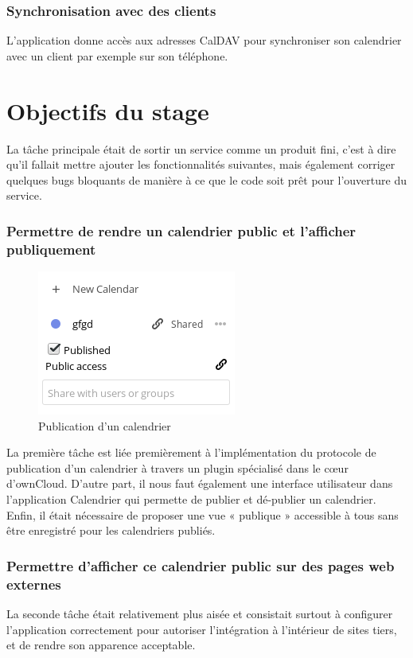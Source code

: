 \documentclass[10pt,a4paper, twoside]{report}
\begin{document}
	\subsubsection{Synchronisation avec des clients}
	L'application donne accès aux adresses CalDAV pour synchroniser son calendrier avec un client par exemple sur son téléphone.
	
	\section{Objectifs du stage}
	
	La tâche principale était de sortir un service comme un produit fini, c'est à dire qu'il fallait mettre ajouter les fonctionnalités suivantes, mais également corriger quelques bugs bloquants de manière à ce que le code soit prêt pour l'ouverture du service.
	
	\subsubsection{Permettre de rendre un calendrier public et l'afficher publiquement}
	
	\begin{figure}
		\begin{center}
		\includegraphics[width=0.3\paperwidth]{images/fonctionnalitepublie.png}
	\end{center}
		\caption{Publication d'un calendrier}
	\end{figure}
	
	La première tâche est liée premièrement à l'implémentation du protocole de publication d'un calendrier à travers un plugin spécialisé dans le cœur d'ownCloud. D'autre part, il nous faut également une interface utilisateur dans l'application Calendrier qui permette de publier et dé-publier un calendrier. Enfin, il était nécessaire de proposer une vue « publique » accessible à tous sans être enregistré pour les calendriers publiés.

	
	\subsubsection{Permettre d'afficher ce calendrier public sur des pages web externes}La seconde tâche était relativement plus aisée et consistait surtout à configurer l'application correctement pour autoriser l'intégration à l'intérieur de sites tiers, et de rendre son apparence acceptable.
	
\end{document}

